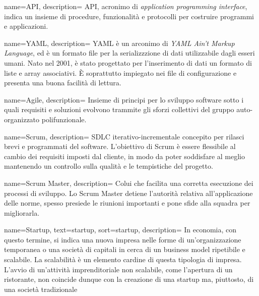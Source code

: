  {
  name=API,
  description={
API, acronimo di \textit{application programming interface}, indica un insieme
di procedure, funzionalità e protocolli per costruire programmi e applicazioni.
}
}

 {
  name=YAML,
  description={
YAML è un arconimo di \textit{YAML Ain't Markup Language}, ed è un formato file
per la serializzzione di dati utilizzabile dagli esseri umani. Nato nel 2001,
è stato progettato per l'inserimento di dati un formato di liste e array
associativi. È soprattutto impiegato nei file di configurazione e
presenta una buona facilità di lettura.
}
}

 {
  name=Agile,
  description={
Insieme di principi per lo sviluppo software sotto i quali requisiti e
soluzioni evolvono trammite gli sforzi collettivi del gruppo auto-organizzato
polifunzionale.
}
}

 {
  name=Scrum,
  description={
SDLC iterativo-incrementale concepito per rilasci brevi e programmati del
software. L'obiettivo di Scrum è essere flessibile al cambio dei requisiti
imposti dal cliente, in modo da poter soddisfare al meglio mantenendo un
controllo sulla qualità e le tempistiche del progetto.
}
}

 {
  name=Scrum Master,
  description={
Colui che facilita una corretta esecuzione dei processi di sviluppo. Lo Scrum
Master detiene l'autorità relativa all'applicazione delle norme, spesso
presiede le riunioni importanti e pone sfide alla squadra per migliorarla.
}
}

{
  name=Startup,
  text=startup,
  sort=startup,
  description={
In economia, con questo termine, si indica una nuova impresa
nelle forme di un'organizzazione temporanea o una società di capitali in cerca
di un business model ripetibile e scalabile.
La scalabilità è un elemento cardine di questa tipologia di impresa. L'avvio di
un'attività imprenditoriale non scalabile, come l'apertura di un ristorante,
non coincide dunque con la creazione di una startup ma, piuttosto, di una
società tradizionale
}
}
